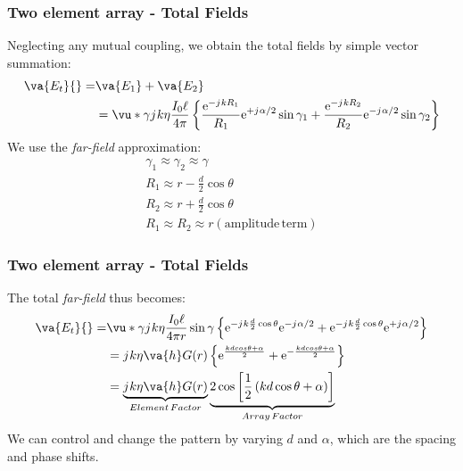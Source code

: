 \documentclass[10pt]{beamer}
\newcommand{\e}{\mathrm{e}} %
\renewcommand{\j}{{j}\mkern1mu} %
\begin{document}
\begin{frame}
    \frametitle{Two element array - Total Fields}
Neglecting any mutual coupling, we obtain the total fields by simple vector summation:
\begin{align*}
    \va{E_t} {}=& \va{E_1} + \va{E_2} \\
    &= \vu*{\gamma} \j k \eta \frac{I_{0} \ell}{4 \pi}\left\{\frac{\e^{-\j k R_{1}}}{R_{1}} \e^{+\j \alpha / 2} \sin \gamma_{1}+\frac{\e^{-\j k R_{2}}}{R_{2}} \e^{-\j \alpha / 2} \sin \gamma_{2}\right\}
 \end{align*}
    We use the \textit{far-field} approximation:
    \begin{align*}
        \gamma_1 \approx \gamma_2 \approx \gamma \\
        R_1 \approx r - \frac{d}{2} \cos \theta \\
        R_2 \approx r + \frac{d}{2} \cos \theta \\
       R_1 \approx R_2 \approx r (\mathrm{amplitude \, term})
    \end{align*}
\end{frame}

\begin{frame}
    \frametitle{Two element array - Total Fields}

    The total \textit{far-field} thus becomes:
    \begin{align*}
        \va{E_t} {}=& \vu*{\gamma} \j k \eta \frac{I_{0} \ell}{4 \pi r} \sin \gamma \left\{\e^{-\j k \frac{d}{2}\cos \theta } \e^{- \j \alpha / 2} + \e^{-\j k \frac{d}{2}\cos \theta } \e^{+\j \alpha / 2}\right\} \\
        &= \j k \eta \va{h} G(r) \left\{ \e^{\frac{k d cos \theta + \alpha}{2}} + \e^{-\frac{k d cos \theta + \alpha}{2}}\right\} \\
        &= \underbrace{\j k \eta \va{h} G(r)}_{Element \, Factor} \underbrace{2 \cos \left[\frac{1}{2}\left(k d \cos \theta + \alpha\right)\right]}_{Array \, Factor}
    \end{align*}
We can control and change the pattern by varying $d$ and $\alpha$, which are the spacing and phase shifts.
\end{frame}
\end{document}
